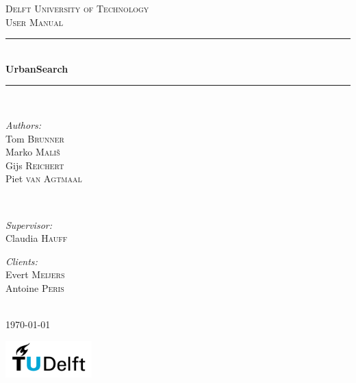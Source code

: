 \begin{titlepage}

\newcommand{\HRule}{\rule{\linewidth}{0.5mm}}

\center
 
\textsc{\LARGE Delft University of Technology}\\[1.5cm]
\textsc{\large User Manual}\\[0.5cm]

\HRule \\[0.4cm]
{ \huge \bfseries UrbanSearch}\\[0.4cm]
\HRule \\[1.5cm]
 

\begin{minipage}{0.4\textwidth}
\begin{flushleft} \large
\emph{Authors:}\\
Tom \textsc{Brunner}\\
Marko \textsc{Mali\v{s}}\\
Gijs \textsc{Reichert}\\
Piet \textsc{van Agtmaal}\\
\end{flushleft}
\end{minipage}
~
\begin{minipage}{0.4\textwidth}
\begin{flushright} \large
\emph{Supervisor:} \\
Claudia \textsc{Hauff}

\emph{Clients:} \\
Evert \textsc{Meijers}\\
Antoine \textsc{Peris}
\end{flushright}
\end{minipage}\\[4cm]


{\large \today}\\[3cm]

\vfill

\raggedright
\includegraphics[width=0.25\textwidth]{logo}

\end{titlepage}